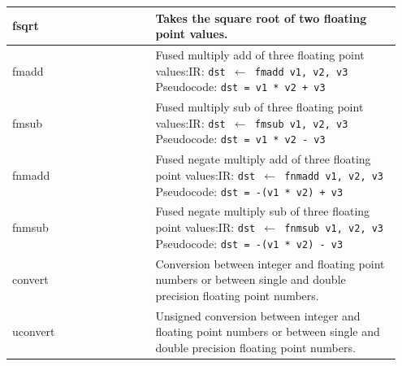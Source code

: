 \documentclass[course=eragp]{aspdoc}
\begin{document}
\begin{center}
\begin{longtable}{p{0.35\linewidth} | p{0.6\linewidth}}
        \hline
        fsqrt        & Takes the square root of two floating point values.                                                                        \\
        \hline
        fmadd        & Fused multiply add of three floating point values:\newline IR: \texttt{dst $\leftarrow$ fmadd v1, v2, v3} \newline
        Pseudocode: \texttt{dst = v1 * v2 + v3}                                                                                                   \\
        \hline
        fmsub        & Fused multiply sub of three floating point values:\newline IR: \texttt{dst $\leftarrow$ fmsub v1, v2, v3} \newline
        Pseudocode: \texttt{dst = v1 * v2 - v3}                                                                                                   \\
        \hline
        fnmadd       & Fused negate multiply add of three floating point values:\newline IR: \texttt{dst $\leftarrow$ fnmadd v1, v2, v3} \newline
        Pseudocode: \texttt{dst = -(v1 * v2) + v3}                                                                                                \\
        \hline
        fnmsub       & Fused negate multiply sub of three floating point values:\newline IR: \texttt{dst $\leftarrow$ fnmsub v1, v2, v3} \newline
        Pseudocode: \texttt{dst = -(v1 * v2) - v3}                                                                                                \\
        \hline
        convert      & Conversion between integer and floating point numbers or between single and double
        precision floating point numbers.
        \\
        \hline
        uconvert     & Unsigned conversion between integer and floating point numbers or between single and double
        precision floating point numbers.                                                                                                         \\
        \hline
    \end{longtable}
    \label{figure:ir_instructions}
\end{center}
\end{document}
